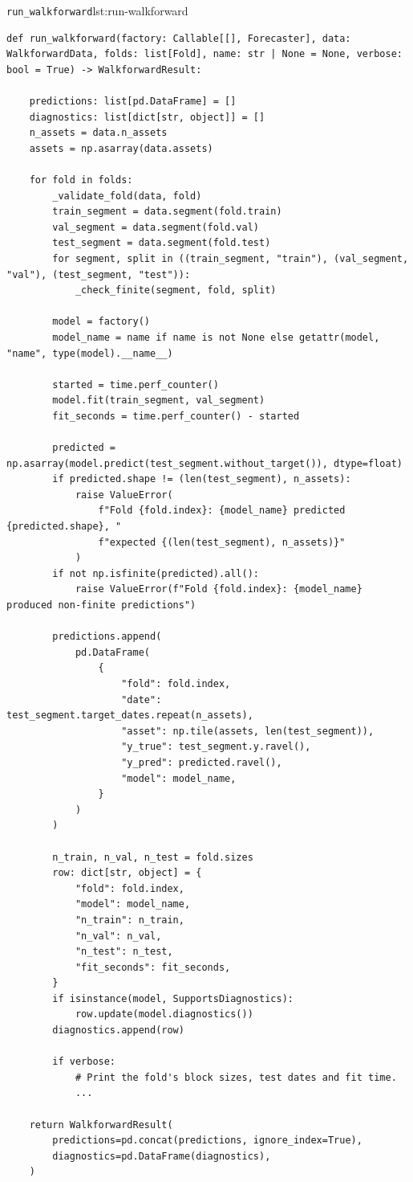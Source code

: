 \begin{longlisting}{\texttt{run\_walkforward}}{lst:run-walkforward}
\begin{verbatim}
def run_walkforward(factory: Callable[[], Forecaster], data: WalkforwardData, folds: list[Fold], name: str | None = None, verbose: bool = True) -> WalkforwardResult:

    predictions: list[pd.DataFrame] = []
    diagnostics: list[dict[str, object]] = []
    n_assets = data.n_assets
    assets = np.asarray(data.assets)

    for fold in folds:
        _validate_fold(data, fold)
        train_segment = data.segment(fold.train)
        val_segment = data.segment(fold.val)
        test_segment = data.segment(fold.test)
        for segment, split in ((train_segment, "train"), (val_segment, "val"), (test_segment, "test")):
            _check_finite(segment, fold, split)

        model = factory()
        model_name = name if name is not None else getattr(model, "name", type(model).__name__)

        started = time.perf_counter()
        model.fit(train_segment, val_segment)
        fit_seconds = time.perf_counter() - started

        predicted = np.asarray(model.predict(test_segment.without_target()), dtype=float)
        if predicted.shape != (len(test_segment), n_assets):
            raise ValueError(
                f"Fold {fold.index}: {model_name} predicted {predicted.shape}, "
                f"expected {(len(test_segment), n_assets)}"
            )
        if not np.isfinite(predicted).all():
            raise ValueError(f"Fold {fold.index}: {model_name} produced non-finite predictions")

        predictions.append(
            pd.DataFrame(
                {
                    "fold": fold.index,
                    "date": test_segment.target_dates.repeat(n_assets),
                    "asset": np.tile(assets, len(test_segment)),
                    "y_true": test_segment.y.ravel(),
                    "y_pred": predicted.ravel(),
                    "model": model_name,
                }
            )
        )

        n_train, n_val, n_test = fold.sizes
        row: dict[str, object] = {
            "fold": fold.index,
            "model": model_name,
            "n_train": n_train,
            "n_val": n_val,
            "n_test": n_test,
            "fit_seconds": fit_seconds,
        }
        if isinstance(model, SupportsDiagnostics):
            row.update(model.diagnostics())
        diagnostics.append(row)

        if verbose:
            # Print the fold's block sizes, test dates and fit time.
            ...

    return WalkforwardResult(
        predictions=pd.concat(predictions, ignore_index=True),
        diagnostics=pd.DataFrame(diagnostics),
    )
\end{verbatim}
\end{longlisting}

